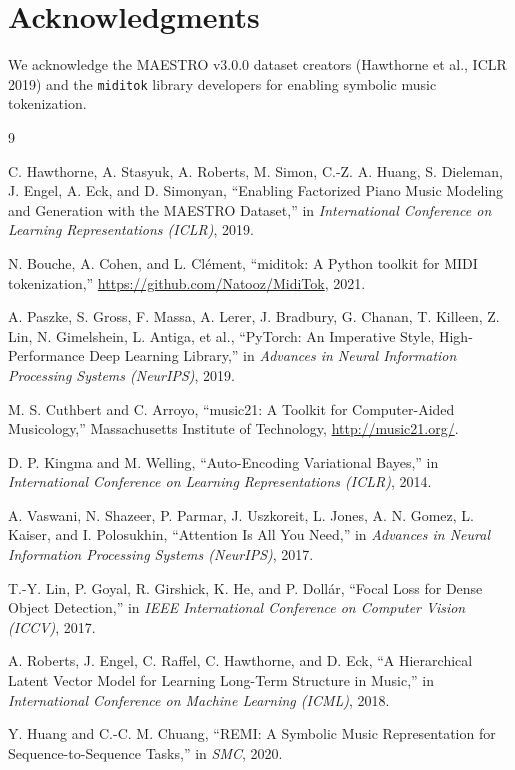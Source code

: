 \documentclass[conference]{IEEEtran}
\begin{document}
\section*{Acknowledgments}
We acknowledge the MAESTRO v3.0.0 dataset creators (Hawthorne et al., ICLR 2019) and the \texttt{miditok} library developers for enabling symbolic music tokenization.

\begin{thebibliography}{9}

C. Hawthorne, A. Stasyuk, A. Roberts, M. Simon, C.-Z. A. Huang, S. Dieleman, J. Engel, A. Eck, and D. Simonyan, ``Enabling Factorized Piano Music Modeling and Generation with the MAESTRO Dataset,'' in \textit{International Conference on Learning Representations (ICLR)}, 2019.

N. Bouche, A. Cohen, and L. Clément, ``miditok: A Python toolkit for MIDI tokenization,'' \url{https://github.com/Natooz/MidiTok}, 2021.

A. Paszke, S. Gross, F. Massa, A. Lerer, J. Bradbury, G. Chanan, T. Killeen, Z. Lin, N. Gimelshein, L. Antiga, et al., ``PyTorch: An Imperative Style, High-Performance Deep Learning Library,'' in \textit{Advances in Neural Information Processing Systems (NeurIPS)}, 2019.

M. S. Cuthbert and C. Arroyo, ``music21: A Toolkit for Computer-Aided Musicology,'' Massachusetts Institute of Technology, \url{http://music21.org/}.

D. P. Kingma and M. Welling, ``Auto-Encoding Variational Bayes,'' in \textit{International Conference on Learning Representations (ICLR)}, 2014.

A. Vaswani, N. Shazeer, P. Parmar, J. Uszkoreit, L. Jones, A. N. Gomez, L. Kaiser, and I. Polosukhin, ``Attention Is All You Need,'' in \textit{Advances in Neural Information Processing Systems (NeurIPS)}, 2017.

T.-Y. Lin, P. Goyal, R. Girshick, K. He, and P. Dollár, ``Focal Loss for Dense Object Detection,'' in \textit{IEEE International Conference on Computer Vision (ICCV)}, 2017.

A. Roberts, J. Engel, C. Raffel, C. Hawthorne, and D. Eck, ``A Hierarchical Latent Vector Model for Learning Long-Term Structure in Music,'' in \textit{International Conference on Machine Learning (ICML)}, 2018.

Y. Huang and C.-C. M. Chuang, ``REMI: A Symbolic Music Representation for Sequence-to-Sequence Tasks,'' in \textit{SMC}, 2020.

\end{thebibliography}
\end{document}
